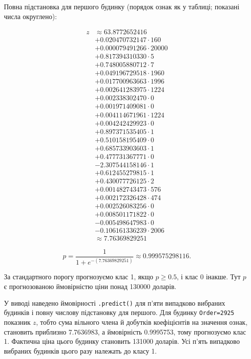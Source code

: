 \Needspace{37.599999999999994pt}


\Needspace{530pt}

Повна підстановка для першого будинку (порядок ознак як у таблиці;
показані числа округлено):

\[\begin{aligned}z &\approx 63.8772652416\\& +0.020470732147\cdot 160\\& +0.000079491266\cdot 20000\\& +0.817394310330\cdot 5\\& +0.748005880712\cdot 7\\& +0.049196729518\cdot 1960\\& +0.017700963663\cdot 1996\\& +0.002641283975\cdot 1224\\& +0.002338302470\cdot 0\\& +0.001971409081\cdot 0\\& +0.004114671961\cdot 1224\\& +0.004242429923\cdot 0\\& +0.897371535405\cdot 1\\& +0.510158195409\cdot 0\\& +0.685733903603\cdot 1\\& +0.477731367771\cdot 0\\& -2.307544158146\cdot 1\\& +0.612455279815\cdot 1\\& +0.430077726125\cdot 2\\& +0.001482743473\cdot 576\\& +0.002172326428\cdot 474\\& +0.002526083256\cdot 0\\& +0.008501171822\cdot 0\\& -0.005498647983\cdot 0\\& -0.106161336239\cdot 2006\\&\approx 7.76369829251\end{aligned}\]

\[p=\frac{1}{1+e^{-(7.76369829251)}}\approx 0.999575298116.\]


\answerheading
За стандартного порогу прогнозуємо клас 1, якщо \(p\ge0.5\), і клас 0
інакше. Тут \(p\) є прогнозованою ймовірністю ціни понад 130000 доларів.

У виводі наведено ймовірності \texttt{.predict()} для п'яти випадково
вибраних будинків і повну числову підстановку для першого. Для будинку
\texttt{Order=2925} показник \(z\), тобто сума вільного члена й добутків
коефіцієнтів на значення ознак, становить приблизно 7.7636983, а
ймовірність 0.9995753, тому прогнозуємо клас 1. Фактична ціна цього
будинку становить 131000 доларів. Усі п'ять випадково вибраних будинків
цього разу належать до класу 1.


